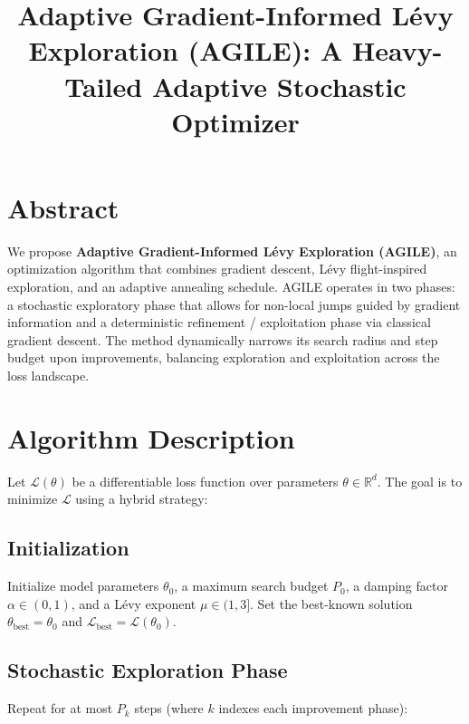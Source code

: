 \documentclass{article}
\title{Adaptive Gradient-Informed Lévy Exploration (AGILE): A Heavy-Tailed Adaptive Stochastic Optimizer}
\author{}
\date{}
\begin{document}
\maketitle

\section*{Abstract}
We propose \textbf{Adaptive Gradient-Informed Lévy Exploration (AGILE)}, an optimization algorithm that combines gradient descent, Lévy flight-inspired exploration, and an adaptive annealing schedule. AGILE operates in two phases: a stochastic exploratory phase that allows for non-local jumps guided by gradient information and a deterministic refinement / exploitation phase via classical gradient descent. The method dynamically narrows its search radius and step budget upon improvements, balancing exploration and exploitation across the loss landscape.

\section{Algorithm Description}

Let \( \mathcal{L}(\theta) \) be a differentiable loss function over parameters \( \theta \in \mathbb{R}^d \). The goal is to minimize \( \mathcal{L} \) using a hybrid strategy:

\subsection{Initialization}
Initialize model parameters \( \theta_0 \), a maximum search budget \( P_0 \), a damping factor \( \alpha \in (0, 1) \), and a Lévy exponent \( \mu \in (1, 3] \). Set the best-known solution \( \theta_{\text{best}} = \theta_0 \) and \( \mathcal{L}_{\text{best}} = \mathcal{L}(\theta_0) \).

\subsection{Stochastic Exploration Phase}
Repeat for at most \( P_k \) steps (where \( k \) indexes each improvement phase):
\end{document}

